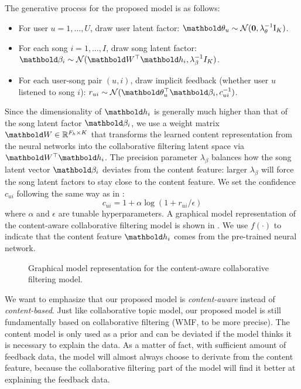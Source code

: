 The generative process for the proposed model is as follows:
\begin{itemize}
\item For user $u = 1, \dots, U$, draw user latent factor: $\mb\theta_{u} \sim \cN(\bzero, \lambda_\theta^{-1} \mathrm{I}_K)$.
\item For each song $i = 1, \dots, I$, draw song latent factor: $\mb\beta_{i} \sim \cN(\mbW^\top \mb{h}_i, \lambda_\beta^{-1} I_K)$.
\item For each user-song pair $(u, i)$, draw implicit feedback (whether user $u$ listened to song $i$): $r_{ui} \sim \mathcal{N}(\mb\theta_u^\top \mb\beta_i, c_{ui}^{-1})$.
\end{itemize}
Since the dimensionality of $\mbh_i$ is generally much higher than that of the song latent factor $\mb\beta_i$, we use a weight matrix $\mbW \in \RR^{F_h \times K}$ that transforms the learned content representation from the neural networks into the collaborative filtering latent space via $\mbW^\top \mb{h}_i$. The precision parameter $\lambda_\beta$ balances how the song latent
vector $\mb\beta_i$ deviates from the content feature: larger $\lambda_\beta$ will force the song latent factors to stay close to the content feature. We set the confidence $c_{ui}$ following the same way as in \citet{hu2008collaborative}:
\[c_{ui} = 1 +  \alpha \log(1 + r_{ui} / \epsilon)\]
where $\alpha$ and $\epsilon$ are tunable hyperparameters. A graphical model representation of the content-aware collaborative filtering model is shown in . We use $f(\cdot)$ to indicate that the content feature $\mbh_i$ comes from the pre-trained neural network. 

\begin{figure}[ht]
  \centering
     
  \caption{Graphical model representation for the content-aware collaborative filtering model.}
\label{chpt:content:fig:gmf_cm}
\end{figure}

We want to emphasize that our proposed model is \emph{content-aware} instead of \emph{content-based}. Just like collaborative topic model, our proposed model is still fundamentally based on collaborative filtering (\gls{WMF}, to be more precise). The content model is only used as a prior and can be deviated if the model thinks it is necessary to explain the data. As a matter of fact, with sufficient amount of feedback data, the model will almost always choose to derivate from the content feature, because the collaborative filtering part of the model will find it better at explaining the feedback data. 

